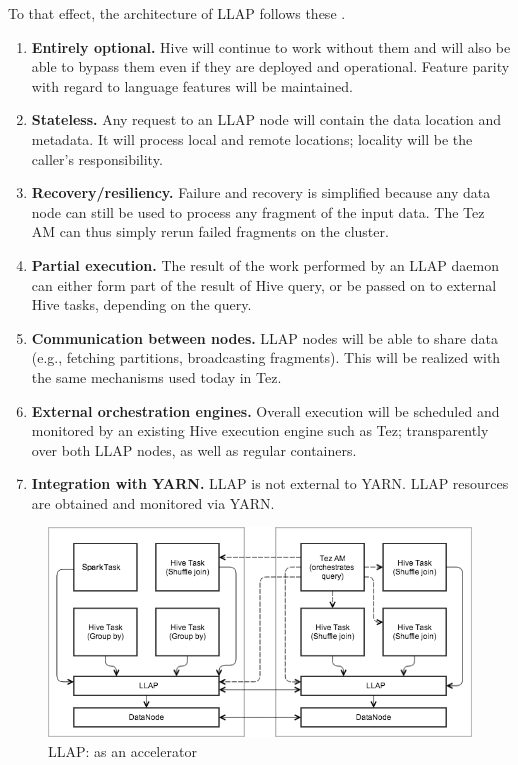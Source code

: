To that effect, the architecture of LLAP follows these .

\begin{enumerate}
\item \textbf{Entirely optional.} Hive will continue to work without them and will also be able to bypass them even if they are deployed and operational.  Feature parity with regard to language features will be maintained. 
\item \textbf{Stateless.} Any request to an LLAP node will contain the data location and metadata. It will process local and remote locations; locality will be the caller’s responsibility.
\item \textbf{Recovery/resiliency.} Failure and recovery is simplified because any data node can still be used to process any fragment of the input data. The Tez AM can thus simply rerun failed fragments on the cluster.
\item \textbf{Partial execution.} The result of the work performed by an LLAP daemon can either form part of the result of Hive query, or be passed on to external Hive tasks, depending on the query.
\item \textbf{Communication between nodes.} LLAP nodes will be able to share data (e.g., fetching partitions, broadcasting fragments). This will be realized with the same mechanisms used today in Tez.
\item \textbf{External orchestration engines.} Overall execution will be scheduled and monitored by an existing Hive execution engine such as Tez; transparently over both LLAP nodes, as well as regular containers.  
\item \textbf{Integration with YARN.} LLAP is not external to YARN. LLAP resources are obtained and monitored via YARN. 
\end{enumerate}

\begin{figure}
\centering
\includegraphics[width=\textwidth]{figures/arch1.png}
\caption{LLAP: as an accelerator}
\label{fig:arch1}
\end{figure} 

